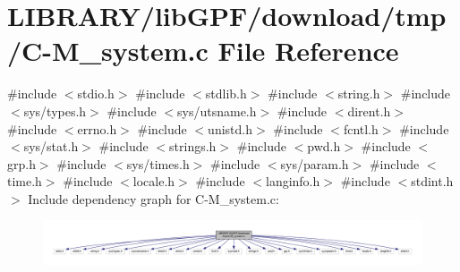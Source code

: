 \hypertarget{C-M__system_8c}{}\section{L\+I\+B\+R\+A\+R\+Y/lib\+G\+P\+F/download/tmp/\+C-\/\+M\+\_\+system.c File Reference}
\label{C-M__system_8c}
{\ttfamily \#include $<$stdio.\+h$>$}\newline
{\ttfamily \#include $<$stdlib.\+h$>$}\newline
{\ttfamily \#include $<$string.\+h$>$}\newline
{\ttfamily \#include $<$sys/types.\+h$>$}\newline
{\ttfamily \#include $<$sys/utsname.\+h$>$}\newline
{\ttfamily \#include $<$dirent.\+h$>$}\newline
{\ttfamily \#include $<$errno.\+h$>$}\newline
{\ttfamily \#include $<$unistd.\+h$>$}\newline
{\ttfamily \#include $<$fcntl.\+h$>$}\newline
{\ttfamily \#include $<$sys/stat.\+h$>$}\newline
{\ttfamily \#include $<$strings.\+h$>$}\newline
{\ttfamily \#include $<$pwd.\+h$>$}\newline
{\ttfamily \#include $<$grp.\+h$>$}\newline
{\ttfamily \#include $<$sys/times.\+h$>$}\newline
{\ttfamily \#include $<$sys/param.\+h$>$}\newline
{\ttfamily \#include $<$time.\+h$>$}\newline
{\ttfamily \#include $<$locale.\+h$>$}\newline
{\ttfamily \#include $<$langinfo.\+h$>$}\newline
{\ttfamily \#include $<$stdint.\+h$>$}\newline
Include dependency graph for C-\/\+M\+\_\+system.c\+:
\nopagebreak
\begin{figure}[H]
\begin{center}
\leavevmode
\includegraphics[width=350pt]{C-M__system_8c__incl}
\end{center}
\end{figure}
